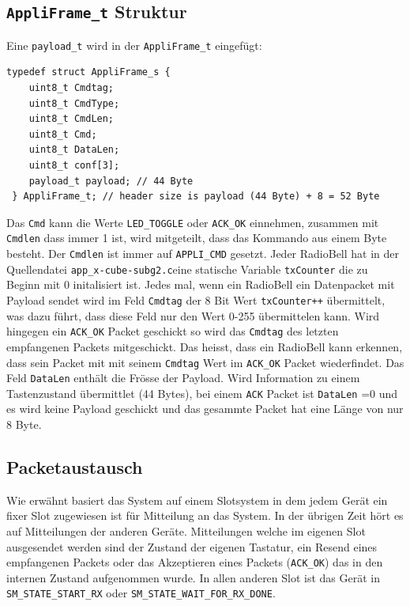\subsection{\texttt{AppliFrame\_t} Struktur}
Eine \texttt{payload\_t} wird in der \texttt{AppliFrame\_t} eingefügt:
\begin{listing}
\begin{verbatim}
typedef struct AppliFrame_s {
    uint8_t Cmdtag;
    uint8_t CmdType;
    uint8_t CmdLen;
    uint8_t Cmd;
    uint8_t DataLen;
    uint8_t conf[3];
    payload_t payload; // 44 Byte
 } AppliFrame_t; // header size is payload (44 Byte) + 8 = 52 Byte
\end{verbatim}
\caption{Definition der \texttt{AppliFrame\_t} Struktur}
\label{AppliFrame_t}
\end{listing}
Das \verb|Cmd| kann die Werte \verb|LED_TOGGLE| oder \verb|ACK_OK| einnehmen, zusammen mit \verb|Cmdlen| dass immer 1 ist, wird mitgeteilt, dass das Kommando aus einem Byte besteht. Der \verb|Cmdlen| ist immer auf \verb|APPLI_CMD| gesetzt. Jeder RadioBell hat in der Quellendatei \verb|app_x-cube-subg2.c|eine statische Variable \verb|txCounter| die zu Beginn mit 0 initalisiert ist. Jedes mal, wenn ein RadioBell ein Datenpacket mit Payload sendet wird im Feld \verb|Cmdtag| der 8 Bit Wert \verb|txCounter++| übermittelt, was dazu führt, dass diese Feld nur den Wert 0-255 übermittelen kann. Wird hingegen ein \verb|ACK_OK| Packet geschickt so wird das \verb|Cmdtag| des letzten empfangenen Packets mitgeschickt. Das heisst, dass ein RadioBell kann erkennen, dass sein Packet mit mit seinem \verb|Cmdtag| Wert im \verb|ACK_OK| Packet wiederfindet. Das Feld \verb|DataLen| enthält die Frösse der Payload. Wird Information zu einem Tastenzustand übermittlet (44 Bytes), bei einem \verb|ACK| Packet ist \verb|DataLen| =0 und es wird keine Payload geschickt und das gesammte Packet hat eine Länge von nur 8 Byte.
 
\subsection{Packetaustausch}
Wie erwähnt basiert das System auf einem Slotsystem in dem jedem Gerät ein fixer Slot zugewiesen ist für Mitteilung an das System. In der übrigen Zeit hört es auf Mitteilungen der anderen Geräte. Mitteilungen welche im eigenen Slot ausgesendet werden sind der Zustand der eigenen Tastatur, ein Resend eines empfangenen Packets oder das Akzeptieren eines Packets (\verb|ACK_OK|) das in den internen Zustand aufgenommen wurde. In allen anderen Slot ist das Gerät in \verb|SM_STATE_START_RX| oder \verb|SM_STATE_WAIT_FOR_RX_DONE|. 

